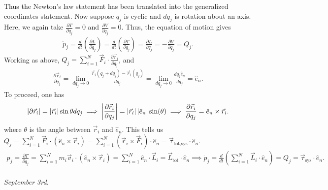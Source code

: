 Thus the Newton's law statement has been translated into the generalized coordinates statement. Now suppose $q_{j}$ is cyclic and $dq_{j}$ is rotation about an axis. Here, we again take $\frac{\partial T}{\partial q_{j}} = 0$ and $\frac{\partial V}{\partial q_{j}} = 0$. Thus, the equation of motion gives
\begin{align}
    \dot{p}_{j} = \frac{d}{dt} \left( \frac{\partial L}{\partial \dot{q}_{j}} \right) = \frac{d}{dt} \left( \frac{\partial T}{\partial \dot{q}_{j}} \right) = \frac{\partial L}{\partial q_{j}} = -\frac{\partial V}{\partial q_{j}} = Q_{j}.
\end{align}
Working as above, $Q_{j} = \sum_{i=1}^{N} \vec{F}_{i} \cdot \frac{\partial \vec{r}_{i}}{\partial q_{j}}$, and
\begin{align}
    \frac{\partial \vec{r}_{i}}{\partial q_{j}} = \lim_{dq_{j} \to 0} \frac{\vec{r}_{i} (q_{j} + dq_{j}) - \vec{r}_{i}(q_{j})}{dq_{j}} = \lim_{dq_{j} \to 0} \frac{dq_{j} \hat{e}_{n}}{dq_{j}} = \hat{e}_{n}.
\end{align}
To proceed, one has
\begin{align}
    \left| \partial \vec{r}_{i} \right| = \left| \vec{r}_{i} \right| \sin \theta dq_{j} \implies \left| \frac{\partial \vec{r}_{i}}{\partial q_{j}} \right| = \left| \vec{r}_{i} \right| \left| \hat{e}_{n} \right| \sin(\theta) \implies \frac{\partial \vec{r}_{i}}{\partial q_{j}} = \hat{e}_{n} \times \vec{r}_{i}.
\end{align}
where $\theta$ is the angle between $\vec{r}_{i}$ and $\hat{e}_{n}$. This tells us $Q_{j} = \sum_{i=1}^{N} \vec{F}_{i} \cdot (\hat{e}_{n} \times \vec{r}_{i}) = \sum_{i=1}^{N} (\vec{r}_{i} \times \vec{F}_{i}) \cdot \hat{e}_{n} = \vec{\tau}_{\text{tot,sys}} \cdot \hat{e}_{n}$.
\begin{align}
    p_{j} = \frac{\partial T}{\partial \dot{q}_{j}} = \sum_{i=1}^{N} m_{i} \vec{v}_{i} \cdot (\hat{e}_{n} \times \vec{r}_{i}) = \sum_{i=1}^{N} \hat{e}_{n} \cdot \vec{L}_{i} = \vec{L}_{\text{tot}} \cdot \hat{e}_{n} \implies \dot{p}_{j} = \frac{d}{dt} \left( \sum_{i=1}^{N} \vec{L}_{i} \cdot \hat{e}_{n} \right) = Q_{j} = \vec{\tau}_{\text{sys}} \cdot \hat{e}_{n}.
\end{align}
\\\textit{September 3rd.}

